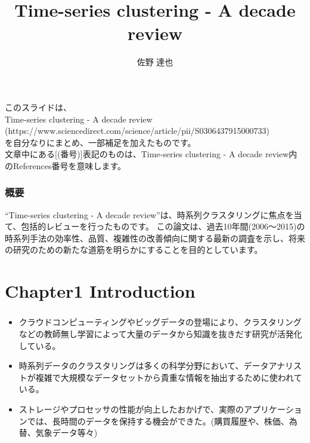 \documentclass[dvipdfmx,11pt,notheorems]{beamer}
\title[英語論文]{Time-series clustering - A decade review}
\author[佐野]{佐野 達也}
\date{}
\theoremstyle{definition}
\begin{document}
	
	\begin{frame}[plain]\frametitle{}
	\titlepage 
\end{frame}

\begin{frame}\frametitle{}
このスライドは、\\
Time-series clustering - A decade review\\
(https://www.sciencedirect.com/science/article/pii/S0306437915000733)\\
を自分なりにまとめ、一部補足を加えたものです。\\
文章中にある[(番号)]表記のものは、Time-series clustering - A decade review内のReferences番号を意味します。

\end{frame}

\begin{frame}\frametitle{概要}
``Time-series clustering - A decade review''は、時系列クラスタリングに焦点を当て、包括的レビューを行ったものです。\newline
\newline
この論文は、過去10年間(2006～2015)の時系列手法の効率性、品質、複雑性の改善傾向に関する最新の調査を示し、将来の研究のための新たな道筋を明らかにすることを目的としています。

\end{frame}

\AtBeginSection[]{
\begin{frame}
\tableofcontents[currentsection]
\end{frame}
}



\begin{frame}\frametitle{}
\tableofcontents
\end{frame}




\section{Chapter1 Introduction}

\begin{frame}\frametitle{}
\begin{itemize}
\item
クラウドコンピューティングやビッグデータの登場により、クラスタリングなどの教師無し学習によって大量のデータから知識を抜きだす研究が活発化している。
\item
時系列データのクラスタリングは多くの科学分野において、データアナリストが複雑で大規模なデータセットから貴重な情報を抽出するために使われている。
\item ストレージやプロセッサの性能が向上したおかげで、実際のアプリケーションでは、長時間のデータを保持する機会ができた。(購買履歴や、株価、為替、気象データ等々)
\end{itemize}

\end{frame}
\end{document}
